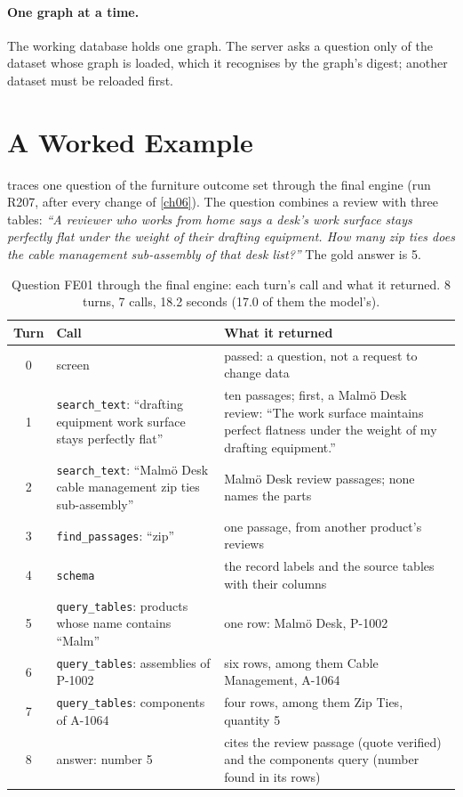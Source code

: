 \paragraph{One graph at a time.} The working database holds one graph. The server asks a question only of the dataset
whose graph is loaded, which it recognises by the graph's digest; another dataset must be reloaded first.

\section{A Worked Example}\label{sec:ch08-a-worked-example}

 traces one question of the furniture outcome set through the final engine (run R207,
after every change of \cref{ch06}). The question combines a review with three tables: \emph{``A reviewer who works
from home says a desk's work surface stays perfectly flat under the weight of their drafting equipment. How many zip
ties does the cable management sub-assembly of that desk list?''} The gold answer is 5.

\begin{table}[htbp]
\centering
\caption{Question FE01 through the final engine: each turn's call and what it returned. 8 turns, 7 calls, 18.2
seconds (17.0 of them the model's).}
\label{tab:worked-example}
\small
\begin{tabularx}{\linewidth}{@{}c>{\raggedright}p{3.6cm}>{\raggedright\arraybackslash}X@{}}
\toprule
Turn & Call & What it returned \\
\midrule
0 & screen & passed: a question, not a request to change data \\
1 & \texttt{search\_text}: ``drafting equipment work surface stays perfectly flat'' & ten passages; first, a Malmö Desk review: ``The work surface maintains perfect flatness under the weight of my drafting equipment.'' \\
2 & \texttt{search\_text}: ``Malmö Desk cable management zip ties sub-assembly'' & Malmö Desk review passages; none names the parts \\
3 & \texttt{find\_passages}: ``zip'' & one passage, from another product's reviews \\
4 & \texttt{schema} & the record labels and the source tables with their columns \\
5 & \texttt{query\_tables}: products whose name contains ``Malm'' & one row: Malmö Desk, P-1002 \\
6 & \texttt{query\_tables}: assemblies of P-1002 & six rows, among them Cable Management, A-1064 \\
7 & \texttt{query\_tables}: components of A-1064 & four rows, among them Zip Ties, quantity 5 \\
8 & answer: number 5 & cites the review passage (quote verified) and the components query (number found in its rows) \\
\bottomrule
\end{tabularx}
\end{table}

